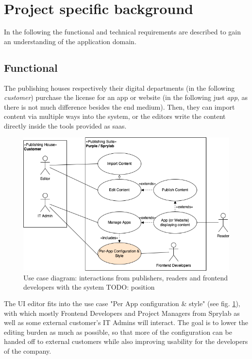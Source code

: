 \section{Project specific background}

In the following the functional and technical requirements are described to gain an understanding of the application domain.

\subsection{Functional}

The publishing houses respectively their digital departments (in the following \textit{customer}) purchase the license for an app or website (in the following just \textit{app}, as there is not much difference besides the end medium).
Then, they can import content via multiple ways into the system, or the editors write the content directly inside the tools provided as \Gls{saas}.

\begin{figure}[h!]
  \includegraphics[width=\textwidth]{pics/purple-abstract.drawio.png}
  \caption{Use case diagram: interactions from publishers, readers and frontend developers with the system TODO: position}
  \label{fig:usecase1}
\end{figure}

The UI editor fits into the use case "Per App configuration \& style" (see fig. \ref*{fig:usecase1}), with which mostly Frontend Developers and Project Managers from Sprylab as well as some external customer's IT Admins will interact. The goal is to lower the editing burden as much as possible, so that more of the configuration can be handed off to external customers while also improving usability for the developers of the company.

